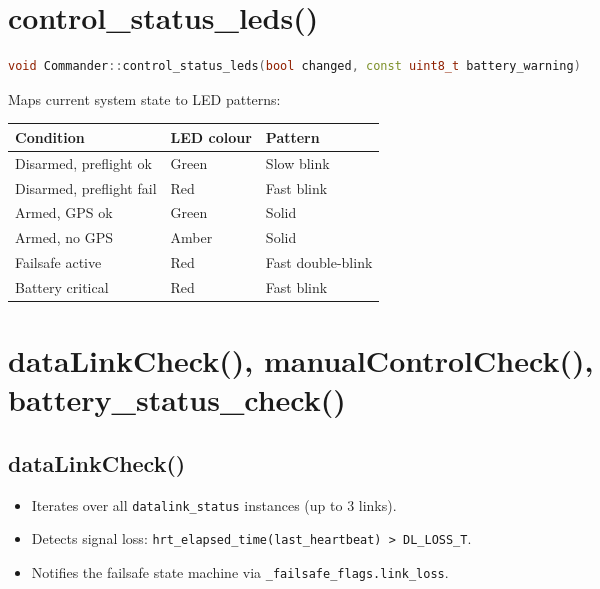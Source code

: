\documentclass[12pt,a4paper]{article}
\begin{document}
\section{control\_status\_leds()}

\begin{lstlisting}[language=C++]
void Commander::control_status_leds(bool changed, const uint8_t battery_warning)
\end{lstlisting}

Maps current system state to LED patterns:
\begin{center}\begin{tabular}{lll}\toprule
Condition & LED colour & Pattern \\\midrule
Disarmed, preflight ok & Green & Slow blink \\
Disarmed, preflight fail & Red & Fast blink \\
Armed, GPS ok & Green & Solid \\
Armed, no GPS & Amber & Solid \\
Failsafe active & Red & Fast double-blink \\
Battery critical & Red & Fast blink \\
\bottomrule\end{tabular}\end{center}

\section{dataLinkCheck(), manualControlCheck(), battery\_status\_check()}

\subsection{dataLinkCheck()}
\begin{itemize}
  \item Iterates over all \texttt{datalink\_status} instances (up to 3 links).
  \item Detects signal loss: \texttt{hrt\_elapsed\_time(last\_heartbeat) > DL\_LOSS\_T}.
  \item Notifies the failsafe state machine via \texttt{\_failsafe\_flags.link\_loss}.
\end{itemize}
\end{document}

